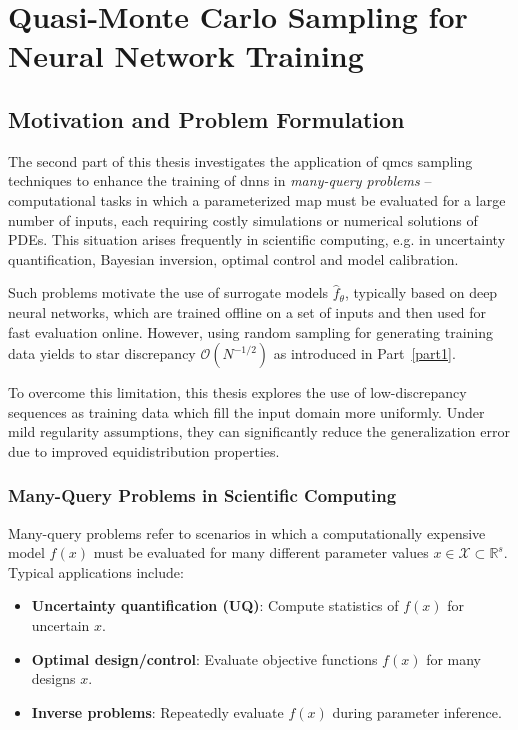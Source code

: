 \part{Quasi-Monte Carlo Sampling for Neural Network Training}
\label{part2}

\chapter{Motivation and Problem Formulation}
\label{chapter4}

The second part of this thesis investigates the application of \acfp{qmc}
sampling techniques to enhance the training of \acfp{dnn} in \emph{many-query
problems} -- computational tasks in which a parameterized map must be evaluated for
a large number of inputs, each requiring costly simulations or numerical
solutions of PDEs. This situation arises frequently in scientific computing,
e.g. in uncertainty quantification, Bayesian inversion, optimal control and
model calibration.

Such problems motivate the use of surrogate models $\hat{f}_\theta$, typically
based on deep neural networks, which are trained offline on a set of inputs and
then used for fast evaluation online. However, using random sampling for
generating training data yields to star discrepancy $\mathcal{O}(N^{-1/2})$ as
introduced in Part~\ref{part1}.

To overcome this limitation, this thesis explores the use of low-discrepancy sequences as training data which fill the input domain more
uniformly. Under mild regularity assumptions, they can significantly reduce the
generalization error due to improved equidistribution properties.

\section{Many-Query Problems in Scientific Computing}
Many-query problems refer to scenarios in which a computationally expensive
model $f(x)$ must be evaluated for many different parameter values $x \in
\mathcal{X} \subset \mathbb{R}^s$. Typical applications include:
\begin{itemize}
  \item \textbf{Uncertainty quantification (UQ)}: Compute statistics of $f(x)$
  for uncertain $x$.
  \item \textbf{Optimal design/control}: Evaluate objective functions $f(x)$ for
  many designs $x$.
  \item \textbf{Inverse problems}: Repeatedly evaluate $f(x)$ during parameter
  inference.
\end{itemize}

